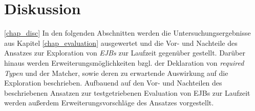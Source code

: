 \chapter{Diskussion}\ref{chap_disc}
In den folgenden Abschnitten werden die Untersuchungsergebnisse aus Kapitel \ref{chap_evaluation} ausgewertet und die Vor- und Nachteile des Ansatzes zur Exploration von \emph{EJBs} zur Laufzeit gegenüber gestellt. Darüber hinaus werden Erweiterungsmöglichkeiten bzgl. der Deklaration von \emph{required Typen} und der Matcher, sowie deren zu erwartende Auswirkung auf die Exploration beschrieben. Aufbauend auf den Vor- und Nachteilen des beschriebenen Ansatzen zur testgetriebenen Evaluation von EJBs zur Laufzeit werden außerdem Erweiterungsvorschläge des Ansatzes vorgestellt.


 
